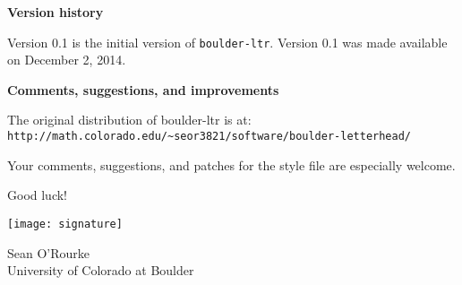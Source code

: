 \documentclass{letter}
\begin{document}
\begin{letter}
{\bf Version history}

Version 0.1 is the initial version of {\verb+boulder-ltr+}.  Version 0.1 was made available on December 2, 2014.  

{\bf Comments, suggestions, and improvements}

The original distribution of boulder-ltr is at:\\
{\verb+http://math.colorado.edu/~seor3821/software/boulder-letterhead/+} 

Your comments, suggestions, and patches for the style file are especially welcome. 


\bigskip

Good luck!

\texttt{[image: signature]}

Sean O'Rourke \\
University of Colorado at Boulder 


\end{letter}
\end{document}
